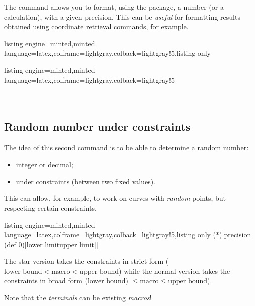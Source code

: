 \documentclass[11pt,a4paper]{ltxdoc}
\begin{document}
The  command allows you to format, using the  package, a number (or a calculation), with a given precision. This can be \textit{useful} for formatting results obtained using coordinate retrieval commands, for example.

\begin{tcblisting}{listing engine=minted,minted language=latex,colframe=lightgray,colback=lightgray!5,listing only}
\end{tcblisting}

\begin{tcblisting}{listing engine=minted,minted language=latex,colframe=lightgray,colback=lightgray!5}
\\
\\
\\
\end{tcblisting}

\subsection{Random number under constraints}\label{nbalea}

The idea of this second command is to be able to determine a random number:

\begin{itemize}
	\item integer or decimal;
	\item under constraints (between two fixed values).
\end{itemize}

This can allow, for example, to work on curves with \textit{random} points, but respecting certain constraints.

\begin{tcblisting}{listing engine=minted,minted language=latex,colframe=lightgray,colback=lightgray!5,listing only}
\PickRandomNb(*)[precision (def 0)]{lower limit}{upper limit}[\macro]
\end{tcblisting}

The star version takes the constraints in strict form ($\text{lower bound} < \text{macro} < \text{upper bound}$) while the normal version takes the constraints in broad form ($\text{lower bound) } \leq \text{macro} \leq \text{upper bound}$).

\smallskip

Note that the \textit{terminals} can be existing \textit{macros}!
\end{document}

